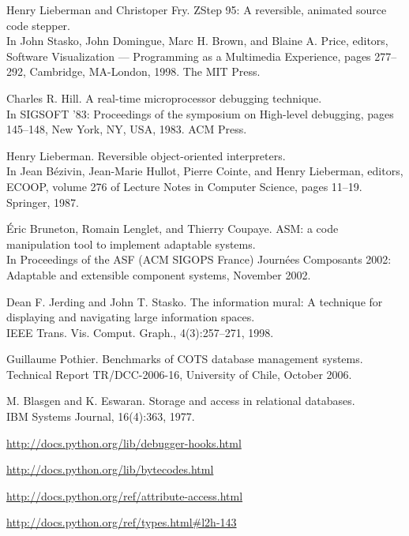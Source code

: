 \documentclass[12pt,legalpaper]{report}
\begin{document}
\begin{thebibliography}{30}
Henry Lieberman and Christoper Fry. ZStep 95: A reversible, animated source code stepper. \\
In John Stasko, John Domingue, Marc H. Brown, and Blaine A. Price, editors, Software Visualization — Programming as a Multimedia Experience, pages 277–292, Cambridge, MA-London, 1998. The MIT Press.

Charles R. Hill. A real-time microprocessor debugging technique. \\
In SIGSOFT ’83: Proceedings of the symposium on High-level debugging, pages 145–148, New York, NY, USA, 1983. ACM Press.

Henry Lieberman. Reversible object-oriented interpreters. \\
In Jean Bézivin, Jean-Marie Hullot, Pierre Cointe, and Henry Lieberman, editors, ECOOP, volume 276 of Lecture Notes in Computer Science, pages 11–19. Springer, 1987.

 Éric Bruneton, Romain Lenglet, and Thierry Coupaye. ASM: a code manipulation tool to implement adaptable systems. \\
In Proceedings of the ASF (ACM SIGOPS France) Journées Composants 2002: Adaptable and extensible component systems, November 2002.

 Dean F. Jerding and John T. Stasko. The information mural: A technique for displaying and navigating large information spaces.\\
IEEE Trans. Vis. Comput. Graph., 4(3):257–271, 1998.

 Guillaume Pothier. Benchmarks of COTS database management systems. \\
Technical Report TR/DCC-2006-16, University of Chile, October 2006.

M. Blasgen and K. Eswaran. Storage and access in relational databases. \\
IBM Systems Journal, 16(4):363, 1977.

\href{http://docs.python.org/lib/debugger-hooks.html}{http://docs.python.org/lib/debugger-hooks.html}

\href{http://docs.python.org/lib/bytecodes.html}{http://docs.python.org/lib/bytecodes.html}

\href{http://docs.python.org/ref/attribute-access.html}{http://docs.python.org/ref/attribute-access.html}

\href{http://docs.python.org/ref/types.html\#l2h-143}{http://docs.python.org/ref/types.html\#l2h-143}


\end{thebibliography}
\end{document}

